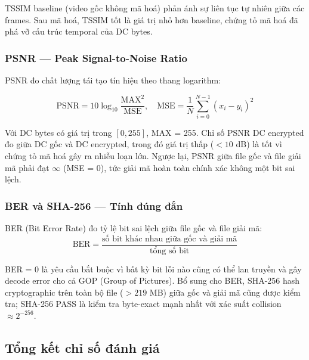 TSSIM baseline (video gốc không mã hoá) phản ánh sự liên tục tự nhiên giữa các frames. Sau mã hoá, TSSIM tốt là giá trị nhỏ hơn baseline, chứng tỏ mã hoá đã phá vỡ cấu trúc temporal của DC bytes.

\subsubsection{PSNR --- Peak Signal-to-Noise Ratio}

PSNR đo chất lượng tái tạo tín hiệu theo thang logarithm:

\begin{equation}
\text{PSNR} = 10 \log_{10} \frac{\text{MAX}^2}{\text{MSE}}, \quad
\text{MSE} = \frac{1}{N}\sum_{i=0}^{N-1}(x_i - y_i)^2
\end{equation}

Với DC bytes có giá trị trong $[0, 255]$, MAX = 255. Chỉ số PSNR DC encrypted đo giữa DC gốc và DC encrypted, trong đó giá trị thấp ($< 10$ dB) là tốt vì chứng tỏ mã hoá gây ra nhiễu loạn lớn. Ngược lại, PSNR giữa file gốc và file giải mã phải đạt $\infty$ (MSE = 0), tức giải mã hoàn toàn chính xác không một bit sai lệch.

\subsubsection{BER và SHA-256 --- Tính đúng đắn}

BER (Bit Error Rate) đo tỷ lệ bit sai lệch giữa file gốc và file giải mã:
\begin{equation}
\text{BER} = \frac{\text{số bit khác nhau giữa gốc và giải mã}}{\text{tổng số bit}}
\end{equation}

BER = 0 là yêu cầu bắt buộc vì bất kỳ bit lỗi nào cũng có thể lan truyền và gây decode error cho cả GOP (Group of Pictures). Bổ sung cho BER, SHA-256 hash cryptographic trên toàn bộ file ($> 219$ MB) giữa gốc và giải mã cũng được kiểm tra; SHA-256 PASS là kiểm tra byte-exact mạnh nhất với xác suất collision $\approx 2^{-256}$.

\subsection{Tổng kết chỉ số đánh giá}

